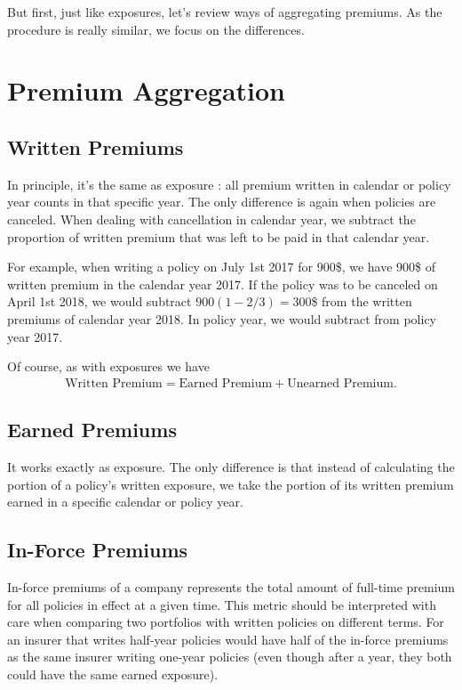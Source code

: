 \documentclass[11pt, english]{memoir}
\numberwithin{definition}{section}
\begin{document}
	But first, just like exposures, let's review ways of aggregating premiums. As the procedure is really similar, we focus on the differences. 
	
	\section{Premium Aggregation}
	\subsection{Written Premiums}
	In principle, it's the same as exposure : all premium written in calendar or policy year counts in that specific year. The only difference is again when policies are canceled. When dealing with cancellation in calendar year, we subtract the proportion of written premium that was left to be paid in that calendar year. 
	
	For example, when writing a policy on July 1st 2017 for 900\$, we have 900\$ of written premium in the calendar year 2017. If the policy was to be canceled on April 1st 2018, we would subtract $ 900(1 - 2/3) = 300 $\$ from the written premiums of calendar year 2018. In policy year, we would subtract from policy year 2017.
	
	Of course, as with exposures we have 
	\begin{align*}
	\text{Written Premium} = \text{Earned Premium} + \text{Unearned Premium}.
	\end{align*} 
	
	\subsection{Earned Premiums}
	It works exactly as exposure. The only difference is that instead of calculating the portion of a policy's written exposure, we take the portion of its written premium earned in a specific calendar or policy year. 
	
	\subsection{In-Force Premiums }
	In-force premiums of a company represents the total amount of full-time premium for all policies in effect at a given time. This metric should be interpreted with care when comparing two portfolios with written policies on different terms. For an insurer that writes half-year policies would have half of the in-force premiums as the same insurer writing one-year policies (even though after a year, they both could have the same earned exposure). 
	
\end{document}
